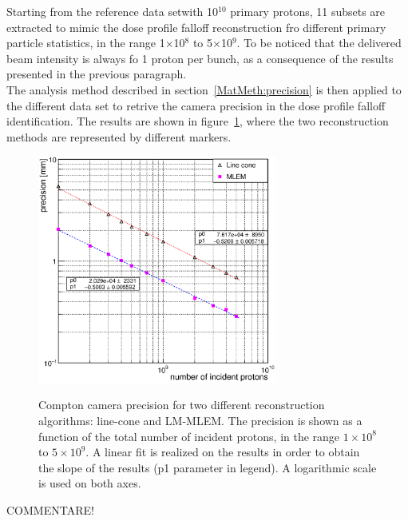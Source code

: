 Starting from the reference data setwith 10$^10$ primary protons, 11 subsets are extracted to mimic the dose profile falloff reconstruction fro different primary particle statistics, in the range 1$\times$10$^8$ to 5$\times$10$^9$. To be noticed that the delivered beam intensity is always fo 1 proton per bunch, as a consequence of the results presented in the previous paragraph.\\
The analysis method described in section~\ref{MatMeth:precision} is then applied to the different data set to retrive the camera precision in the  dose profile falloff identification. The results are shown in figure~\ref{fig:precision}, where the two reconstruction methods are represented by different markers.\\

\begin{figure}[!hbtp]	
\centering
\caption{Compton camera precision for two different reconstruction algorithms: line-cone and LM-MLEM. The precision is shown as a function of the total number of incident protons, in the range $1\times10^{8}$ to $5\times10^{9}$. A linear fit is realized on the results in order to obtain the slope of the results (p1 parameter in legend). A logarithmic scale is used on both axes. }	
\includegraphics[width=0.7\textwidth]{./Figure/2017-10-21_Precision_Comparaison_linecone_MLEM_Article_Fit.eps}
\label{fig:precision}
\end{figure}

COMMENTARE!



